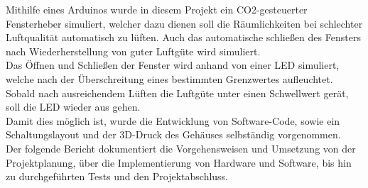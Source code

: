 
\label{Einleitung}

Mithilfe eines Arduinos wurde in diesem Projekt ein CO2-gesteuerter Fensterheber simuliert, welcher dazu dienen soll die Räumlichkeiten bei schlechter Luftqualität automatisch zu lüften. Auch das automatische schließen des Fensters nach Wiederherstellung von guter Luftgüte wird simuliert. \\
Das Öffnen und Schließen der Fenster wird anhand von einer LED simuliert, welche nach der Überschreitung eines bestimmten Grenzwertes aufleuchtet. Sobald nach ausreichendem Lüften die Luftgüte unter einen Schwellwert gerät, soll die LED wieder aus gehen. \\
Damit dies möglich ist, wurde die Entwicklung von Software-Code, sowie ein Schaltungslayout und der 3D-Druck des Gehäuses selbständig vorgenommen. \\
Der folgende Bericht dokumentiert die Vorgehensweisen und Umsetzung von der Projektplanung, über die Implementierung von Hardware und Software, bis hin zu durchgeführten Tests und den Projektabschluss.